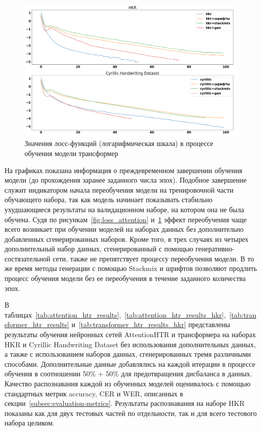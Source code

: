 \begin{figure}[h!]
    \centering
    \includegraphics[width=\textwidth]{img/losses_transformer}
    \caption{Значения лосс-функций (логарифмическая шкала) в процессе обучения модели трансформер}
    \label{fig:loss_transformer}
\end{figure}

На графиках показана информация о преждевременном завершении обучения модели (до прохождения заранее заданного числа эпох).
Подобное завершение служит индикатором начала переобучения модели на тренировочной части обучающего набора,
так как модель начинает показывать стабильно ухудшающиеся результаты на валидационном наборе, на котором она не была обучена.
Судя по рисункам~\ref{fig:loss_attention} и~\ref{fig:loss_transformer} эффект переобучения чаще всего возникает
при обучении моделей на наборах данных без дополнительно добавленных сгенерированных наборов.
Кроме того, в трех случаях из четырех дополнительный набор данных, сгенерированный с помощью генеративно-состязательной сети,
также не препятствует процессу переобучения модели.
В то же время методы генерации с помощью Stackmix и шрифтов
позволяют продлить процесс обучения модели без ее переобучения в течение заданного количества эпох.

В таблицах~\ref{tab:attention_htr_results},~\ref{tab:attention_htr_results_hkr},~\ref{tab:transformer_htr_results} и~\ref{tab:transformer_htr_results_hkr}
представлены результаты обучения нейронных сетей AttentionHTR и трансформера на наборах HKR и Cyrillic Handwriting Dataset
без использования дополнительных данных, а также с использованием наборов данных, сгенерированных тремя различными способами.
Дополнительные данные добавлялись на каждой итерации в процессе обучения в соотношении 50\% + 50\% для предотвращения дисбаланса в данных.
Качество распознавания каждой из обученных моделей оценивалось с помощью стандартных метрик accuracy, CER и WER, описанных в секции~\ref{subsec:evaluation-metrics}.
Результаты распознавания на наборе HKR показаны как для двух тестовых частей по отдельности, так и для всего тестового набора целиком.

